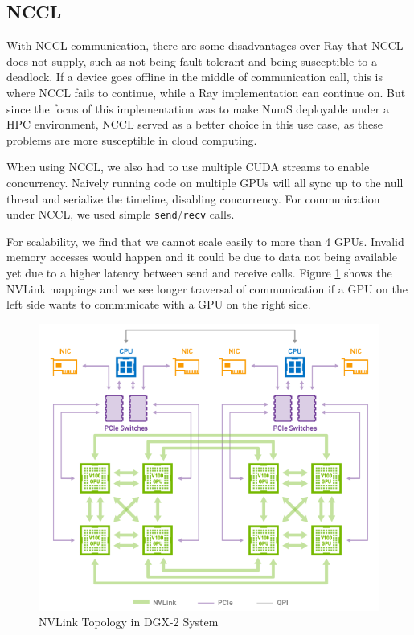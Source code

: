 \documentclass{article}
\begin{document}
\subsection{NCCL}
With NCCL communication, there are some disadvantages over Ray that NCCL does not supply, such as not being fault tolerant and being susceptible to a deadlock. If a device goes offline in the middle of communication call, this is where NCCL fails to continue, while a Ray implementation can continue on. But since the focus of this implementation was to make NumS deployable under a HPC environment, NCCL served as a better choice in this use case, as these problems are more susceptible in cloud computing. 

When using NCCL, we also had to use multiple CUDA streams to enable concurrency. Naively running code on multiple GPUs will all sync up to the null thread and serialize the timeline, disabling concurrency. For communication under NCCL, we used simple \verb|send|/\verb|recv| calls.

For scalability, we find that we cannot scale easily to more than 4 GPUs. Invalid memory accesses would happen and it could be due to data not being available yet due to a higher latency between send and receive calls. Figure \ref{fig:nvlink} shows the NVLink mappings and we see longer traversal of communication if a GPU on the left side wants to communicate with a GPU on the right side. 

\begin{figure}
  \centerline{\includegraphics[width=5in]{figures/nvlink.png}}
  \caption{NVLink Topology in DGX-2 System}
  \label{fig:nvlink}
\end{figure}
\end{document}
